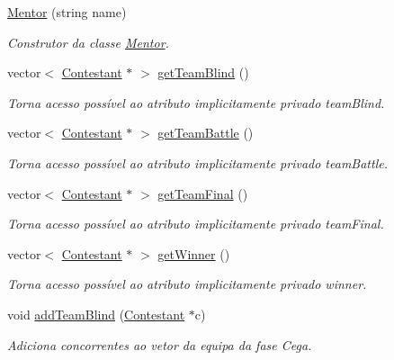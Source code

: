 \begin{DoxyCompactItemize}
\item 
\hyperlink{class_mentor_aaeadeaf5fc979243907d643c5f6d0724}{Mentor} (string name)
\begin{DoxyCompactList}\small\item\em Construtor da classe \hyperlink{class_mentor}{Mentor}. \end{DoxyCompactList}\item 
vector$<$ \hyperlink{class_contestant}{Contestant} $\ast$ $>$ \hyperlink{class_mentor_a17141c1586d8f01dab4ad23af7281894}{get\+Team\+Blind} ()
\begin{DoxyCompactList}\small\item\em Torna acesso possível ao atributo implicitamente privado team\+Blind. \end{DoxyCompactList}\item 
vector$<$ \hyperlink{class_contestant}{Contestant} $\ast$ $>$ \hyperlink{class_mentor_a9b549210f82be5527eac9c86bf06505c}{get\+Team\+Battle} ()
\begin{DoxyCompactList}\small\item\em Torna acesso possível ao atributo implicitamente privado team\+Battle. \end{DoxyCompactList}\item 
vector$<$ \hyperlink{class_contestant}{Contestant} $\ast$ $>$ \hyperlink{class_mentor_aab229229a4b59ed74cb10a09550382e4}{get\+Team\+Final} ()
\begin{DoxyCompactList}\small\item\em Torna acesso possível ao atributo implicitamente privado team\+Final. \end{DoxyCompactList}\item 
vector$<$ \hyperlink{class_contestant}{Contestant} $\ast$ $>$ \hyperlink{class_mentor_ac05f8106cb7946dd13d3c3efafb4c3d2}{get\+Winner} ()
\begin{DoxyCompactList}\small\item\em Torna acesso possível ao atributo implicitamente privado winner. \end{DoxyCompactList}\item 
void \hyperlink{class_mentor_a56c5c3fa81d48bc50221030e3daa22b0}{add\+Team\+Blind} (\hyperlink{class_contestant}{Contestant} $\ast$c)
\begin{DoxyCompactList}\small\item\em Adiciona concorrentes ao vetor da equipa da fase Cega. \end{DoxyCompactList}\item 

\end{DoxyCompactItemize}
